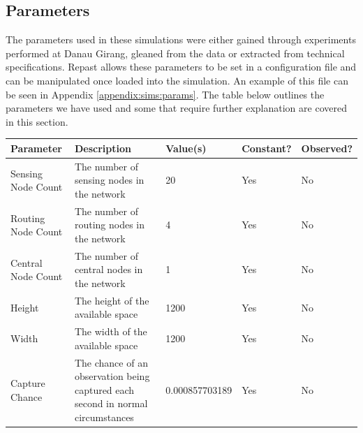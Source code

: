 \subsection{Parameters}
The parameters used in these simulations were either gained through experiments performed at Danau Girang, gleaned from the data or extracted from technical specifications. Repast allows these parameters to be set in a configuration file and can be manipulated once loaded into the simulation. An example of this file can be seen in Appendix \ref{appendix:sims:params}. The table below outlines the parameters we have used and some that require further explanation are covered in this section.
	\begin{landscape}
	\begin{table} 
	\begin{tabularx}{\textwidth}{|p{4cm}|p{10cm}|p{3cm}|p{2cm}|p{2cm}|}
\toprule
	\textbf{Parameter}                      & \textbf{Description}                                                                                                        & \textbf{Value(s)}   & \textbf{Constant?} & \textbf{Observed?} \\
\midrule
	Sensing Node Count                      & The number of sensing nodes in the network                                                                                  & 20                  & Yes                & No                 \\
	Routing Node Count                      & The number of routing nodes in the network                                                                                  & 4                   & Yes                & No                 \\
	Central Node Count                      & The number of central nodes in the network                                                                                  & 1                   & Yes                & No                 \\
	Height                                  & The height of the available space                                                                                           & 1200                & Yes                & No                 \\
	Width                                   & The width of the available space                                                                                            & 1200                & Yes                & No                 \\
	Capture Chance                          & The chance of an observation being captured each second in normal circumstances                                             & 0.000857703189      & Yes                & No                 \\

\end{tabularx}
\end{table}
\end{landscape}
